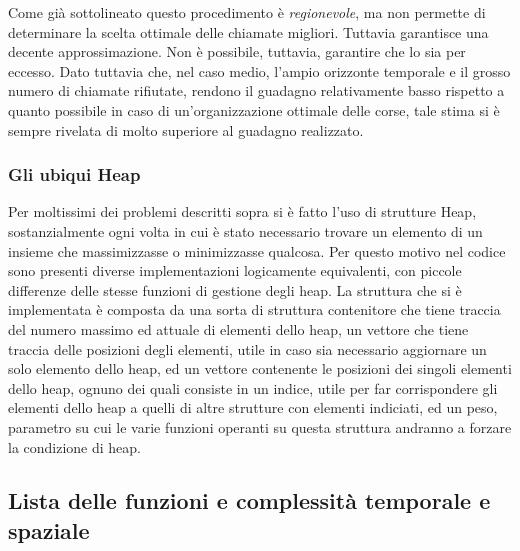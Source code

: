 \documentclass[a4paper,11pt]{Article}
\begin{document}
Come già sottolineato questo procedimento è \textit{regionevole}, ma non permette di determinare la scelta ottimale delle chiamate migliori. Tuttavia garantisce una decente approssimazione. Non è possibile, tuttavia, garantire che lo sia per eccesso.
Dato tuttavia che, nel caso medio, l'ampio orizzonte temporale e il grosso numero di chiamate rifiutate, rendono il guadagno relativamente basso rispetto a quanto possibile in caso di un'organizzazione ottimale delle corse, tale stima si è sempre rivelata di molto superiore al guadagno realizzato.

\subsubsection{Gli ubiqui Heap}
Per moltissimi dei problemi descritti sopra si è fatto l'uso di strutture Heap, sostanzialmente ogni volta in cui è stato necessario trovare un elemento di un insieme che massimizzasse o minimizzasse qualcosa. Per questo motivo nel codice sono presenti diverse implementazioni logicamente equivalenti, con piccole differenze delle stesse funzioni di gestione degli heap.
La struttura che si è implementata è composta da una sorta di struttura contenitore che tiene traccia del numero massimo ed attuale di elementi dello heap, un vettore che tiene traccia delle posizioni degli elementi, utile in caso sia necessario aggiornare un solo elemento dello heap, ed un vettore contenente le posizioni dei singoli elementi dello heap, ognuno dei quali consiste in un indice, utile per far corrispondere gli elementi dello heap a quelli di altre strutture con elementi indiciati, ed un peso, parametro su cui le varie funzioni operanti su questa struttura andranno a forzare la condizione di heap.


\subsection{Lista delle funzioni e complessità temporale e spaziale}
\end{document}
